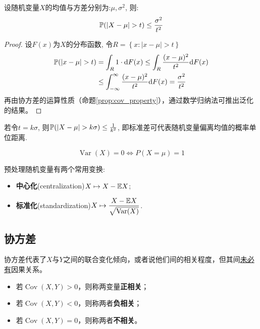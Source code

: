 \begin{theorem}[Chebyshev不等式]
    设随机变量$X$的均值与方差分别为:$\mu, \sigma^2$, 则:
    \[ \P(\left| X-\mu \right| >t)\le \frac{\sigma^{2}}{t^{2}} \]
\end{theorem}

\begin{proof}
    设$F(x)$为$X$的分布函数, 令$R=\left\{ x:|x-\mu|>t \right\}$
    \begin{align*}
        \P(|x-\mu|>t) & = \int_R 1 \cdot  \d F(x) \le \int_R \frac{(x-\mu)^2}{t^{2}}\d F(x)                   \\
                      & \le \int_{-\infty}^{\infty}\frac{(x-\mu)^2}{t^{2}}\d F(x)  = \frac{\sigma^{2}}{t^{2}}
    \end{align*}
    再由协方差的运算性质（命题\ref{prop:cov_property}），通过数学归纳法可推出泛化的结果。
\end{proof}

\begin{remark}
    若令$t=k\sigma$, 则$\P(| X-\mu | >k\sigma)\le \frac1{k^{2}}$, 即标准差可代表随机变量偏离均值的概率单位距离.
\end{remark}

\begin{corollary}\label{cor:var_almost_equal}
    \[ \operatorname{Var}(X)=0 \Leftrightarrow P(X=\mu)=1 \]
\end{corollary}

预处理随机变量有两个常用变换:
\begin{itemize}
    \item \textbf{中心化}(centralization)$X \mapsto X-\E{X}$;
    \item \textbf{标准化}(standardization)$X \mapsto \dfrac{X-\E{X}}{\sqrt{\Var(X)}}$.
\end{itemize}

\subsection{协方差}

协方差代表了$X$与$Y$之间的联合变化倾向，或者说他们间的相关程度，但其间\underline{未必有}因果关系。
\begin{itemize}
    \item 若$\operatorname{Cov}(X,Y) >0$，则称两变量\textbf{正相关}；
    \item 若$\operatorname{Cov}(X,Y) < 0$，则称两者\textbf{负相关}；
    \item 若$\operatorname{Cov}(X,Y) = 0$，则称两者\textbf{不相关}。
\end{itemize}

